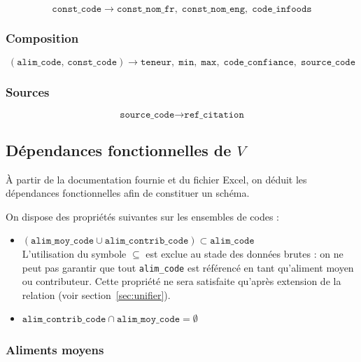 \documentclass[12pt, a4paper]{article}
\newcommand{\attr}[1]{\texttt{#1}}
\begin{document}
    \[
        \attr{const\_code} \rightarrow \attr{const\_nom\_fr},\; \attr{const\_nom\_eng},\; \attr{code\_infoods}
    \]

    \subsubsection*{Composition}

    \[
        (\attr{alim\_code},\, \attr{const\_code}) \rightarrow \attr{teneur},\; \attr{min},\; \attr{max},\; \attr{code\_confiance},\; \attr{source\_code}
    \]

    \subsubsection*{Sources}

    \[
        \attr{source\_code} \rightarrow \attr{ref\_citation}
    \]


    \subsection{Dépendances fonctionnelles de \texorpdfstring{$V$}{V}}

    À partir de la documentation fournie et du fichier Excel, on déduit les dépendances fonctionnelles
    afin de constituer un schéma.

    On dispose des propriétés suivantes sur les ensembles de codes :

    \begin{itemize}
        \item $(\attr{alim\_moy\_code} \cup \attr{alim\_contrib\_code}) \subset \attr{alim\_code}$\\
        L'utilisation du symbole $\subseteq$ est exclue au stade des données brutes : on ne peut pas
        garantir que tout \attr{alim\_code} est référencé en tant qu'aliment moyen ou contributeur.
        Cette propriété ne sera satisfaite qu'après extension de la relation (voir
        section~\ref{sec:unifier}).

        \item $\attr{alim\_contrib\_code} \cap \attr{alim\_moy\_code} = \emptyset$
    \end{itemize}

    \subsubsection*{Aliments moyens}
\end{document}
